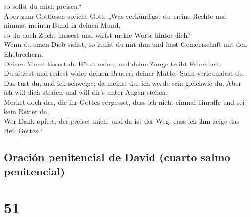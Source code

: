 so sollst du mich preisen.``\\
 Aber zum Gottlosen spricht Gott: „Was verkündigst du
meine Rechte und nimmst meinen Bund in deinen Mund,\\
 so du doch Zucht hassest und wirfst meine Worte hinter
dich?\\
 Wenn du einen Dieb siehst, so läufst du mit ihm und hast
Gemeinschaft mit den Ehebrechern.\\
 Deinen Mund lässest du Böses reden, und deine Zunge
treibt Falschheit.\\
 Du sitzest und redest wider deinen Bruder; deiner Mutter
Sohn verleumdest du.\\
 Das tust du, und ich schweige; da meinst du, ich werde
sein gleichwie du. Aber ich will dich strafen und will dir's unter Augen
stellen.\\
 Merket doch das, die ihr Gottes vergesset, dass ich
nicht einmal hinraffe und sei kein Retter da.\\
 Wer Dank opfert, der preiset mich; und da ist der Weg,
dass ich ihm zeige das Heil Gottes.``

\hypertarget{oraciuxf3n-penitencial-de-david-cuarto-salmo-penitencial}{%
\subsection{Oración penitencial de David (cuarto salmo
penitencial)}\label{oraciuxf3n-penitencial-de-david-cuarto-salmo-penitencial}}

\hypertarget{section-50}{%
\section{51}\label{section-50}}

